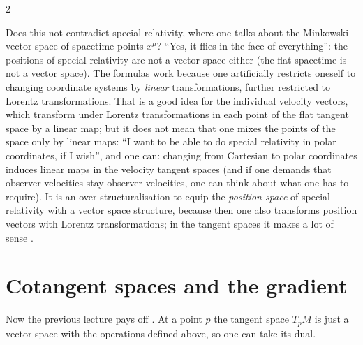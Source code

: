 \begin{paracol}{2}
\begin{aside}
Does this not contradict special relativity, where one talks about the Minkowski vector space of spacetime points $x^\mu$? ``Yes, it flies in the face of everything'': the positions of special relativity are not a vector space either (the flat spacetime is not a vector space). The formulas work because one artificially restricts oneself to changing coordinate systems by \emph{linear} transformations, further restricted to Lorentz transformations.
That is a good idea for the individual velocity vectors, which transform under Lorentz transformations in each point of the flat tangent space by a linear map; but it does not mean that one mixes the points of the space only by linear maps: ``I want to be able to do special relativity in polar coordinates, if I wish'', and one can: changing from Cartesian to polar coordinates induces linear maps in the velocity tangent spaces
(and if one demands that observer velocities stay observer velocities, one can think about what one has to require). It is an over-structuralisation to equip the \emph{position space} of special relativity with a vector space structure, because then one also transforms position vectors with Lorentz transformations; in the tangent spaces it makes a lot of sense .
\end{aside}

\section{Cotangent spaces and the gradient}\label{sec:c05-cotangent}

Now the previous lecture pays off . At a point $p$ the tangent space $T_pM$ is just a vector space with the operations defined above, so one can take its dual.


\end{paracol}
